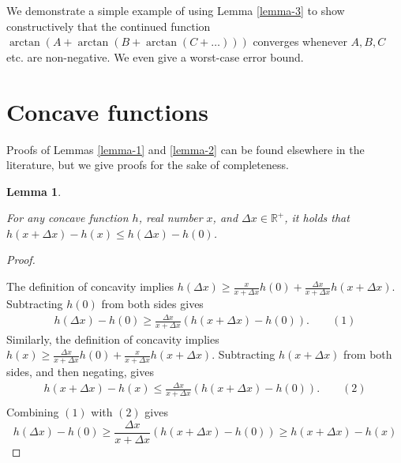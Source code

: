 \documentclass[
]{article}
\theoremstyle{theorem}
\theoremstyle{lemma}
\newtheorem{lemma}{Lemma}
\theoremstyle{corollary}
\theoremstyle{remark}
\theoremstyle{definition}
\begin{document}
We demonstrate a simple example of using Lemma \ref{lemma-3} to show constructively that the continued function \(\arctan(A + \arctan(B + \arctan(C + \dotsc)))\) converges whenever \(A, B, C\) etc. are non-negative. We even give a worst-case error bound.

\hypertarget{concave-functions}{%
\section{Concave functions}\label{concave-functions}}

Proofs of Lemmas \ref{lemma-1} and \ref{lemma-2} can be found elsewhere in the literature, but we give proofs for the sake of completeness.

\begin{lemma}
\hypertarget{lemma-1}{%
\label{lemma-1}}


For any concave function \(h\), real number \(x\), and \(\Delta x \in \mathbb R^+\), it holds that \(h(x+\Delta x) - h(x) \leq h(\Delta x) - h(0)\).
\end{lemma}
\begin{proof}
\hypertarget{proof}{%
\label{proof}}
The definition of concavity implies \(h(\Delta x) \geq \frac{x}{x + \Delta x}h(0) + \frac{\Delta x}{x + \Delta x} h(x + \Delta x).\) Subtracting \(h(0)\) from both sides gives \[\begin{aligned}
h(\Delta x) - h(0) \geq \frac{\Delta x}{x + \Delta x}(h(x+\Delta x) - h(0)).\qquad{(1)}
\end{aligned}\] Similarly, the definition of concavity implies \(h(x) \geq \frac{\Delta x}{x + \Delta x}h(0) + \frac{ x}{x + \Delta x} h(x + \Delta x).\) Subtracting \(h(x + \Delta x)\) from both sides, and then negating, gives \[\begin{aligned}
h(x + \Delta x) - h(x) \leq \frac{\Delta x}{x + \Delta x}(h(x + \Delta x) - h(0)). \qquad{(2)}\\
\end{aligned}\] Combining \((1)\) with \((2)\) gives \[h(\Delta x) - h(0) \geq  \frac{\Delta x}{x + \Delta x}(h(x+\Delta x) - h(0)) \geq h(x + \Delta x) - h(x)\] \end{proof}
\end{document}
